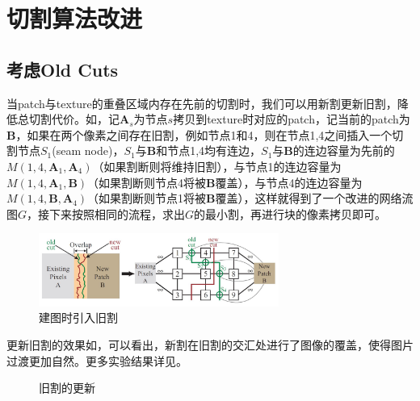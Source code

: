 \documentclass[11pt,a4paper]{article}
\begin{document}
\section{切割算法改进}

\subsection{考虑Old Cuts}

当patch与texture的重叠区域内存在先前的切割时，我们可以用新割更新旧割，降低总切割代价。如，记$\mathbf{A}_s$为节点$s$拷贝到texture时对应的patch，记当前的patch为$\mathbf{B}$，如果在两个像素之间存在旧割，例如节点1和4，则在节点1,4之间插入一个切割节点$S_1$(seam node)，$S_1$与$\mathbf{B}$和节点1,4均有连边，$S_1$与$\mathbf{B}$的连边容量为先前的$M(1,4,\mathbf{A}_1,\mathbf{A}_4)$（如果割断则将维持旧割），与节点1的连边容量为$M(1,4,\mathbf{A}_1,\mathbf{B})$（如果割断则节点4将被$\mathbf{B}$覆盖），与节点4的连边容量为$M(1,4,\mathbf{B},\mathbf{A}_4)$（如果割断则节点1将被$\mathbf{B}$覆盖），这样就得到了一个改进的网络流图$G$，接下来按照相同的流程，求出$G$的最小割，再进行块的像素拷贝即可。

\begin{figure}[H]
    \centering
    \includegraphics[width=0.7\textwidth]{fig/update_cut.jpg}
    \caption{建图时引入旧割}
    \label{fig:oldcut}
\end{figure}

更新旧割的效果如，可以看出，新割在旧割的交汇处进行了图像的覆盖，使得图片过渡更加自然。更多实验结果详见。

\begin{figure}[H]
    \centering
    \caption{旧割的更新}
    \label{fig:update_cut}
\end{figure}
\end{document}
